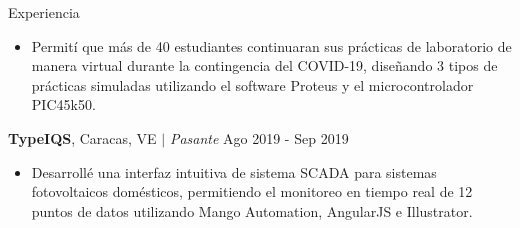 \documentclass{resume} %
\begin{document}
\begin{rSection}{Experiencia}
\begin{itemize}
    \item Permití que más de 40 estudiantes continuaran sus prácticas de laboratorio de manera virtual durante la contingencia del COVID-19, diseñando 3 tipos de prácticas simuladas utilizando el software Proteus y el microcontrolador PIC45k50.
\end{itemize}



\textbf{TypeIQS}, Caracas, VE $\mid$ \textit{Pasante} \hfill Ago 2019 - Sep 2019

\begin{itemize}
    \item Desarrollé una interfaz intuitiva de sistema SCADA para sistemas fotovoltaicos domésticos, permitiendo el monitoreo en tiempo real de 12 puntos de datos utilizando Mango Automation, AngularJS e Illustrator.
\end{itemize}



\end{rSection}

\end{document}
